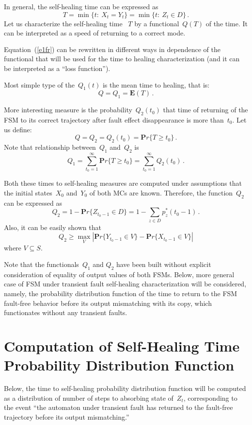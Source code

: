 \begin{multicols}{2}
In general, the self-healing time  can be expressed as
\begin{equation}
T =
\min\{t:\ X_t=Y_t\}=\min\{t:\ Z_t\in D\}\,.
\label{e1fr}
\end{equation}
Let us characterize the self-healing time ~$T$ by
a functional~$Q(T)$ of the time.
It can be interpreted as a speed of returning to
a correct mode.

Equation~(\ref{e1fr}) can be rewritten in different ways in
dependence of the functional that will be used for the time to healing characterization (and
it can be interpreted as a ``loss function'').

Most simple type of the~$Q_1(t)$ is the mean time
to healing, that is:
$$
Q = Q_1 = {\mathbf E}(T)\,.
$$

More interesting measure is the probability~$Q_2(t_0)$
that time of returning of the FSM to its correct
trajectory
after fault effect disappearance  is more than~$t_0$.
Let us define:
$$
Q = Q_2 = Q_2(t_0) = {\mathbf Pr}\{T\ge t_0\}\,.
$$
Note that relationship between~$Q_1$ and~$Q_2$ is
$$
Q_1 =
\sum_{t_0=1}^\infty {\mathbf Pr}\{T\ge t_0\}
=
\sum_{t_0=1}^\infty Q_2(t_0)\,.
$$

Both these times to self-healing measures are computed
under assumptions that the initial states~$X_0$ and~$Y_0$ of both MCs are known.
Therefore, the function~$Q_2$ can be expressed as
$$
Q_2
=
1 - {\mathbf Pr}\{Z_{t_0-1}\in D\}
=
1 - \sum_{z\in D} p_{z}^*(t_0-1)\,.
$$
Also, it can be easily shown   that
$$
Q_2
\ge
\max\limits_V
\left|{\mathbf Pr}\{Y_{t_0-1}\in V\}
-
{\mathbf Pr}\{X_{t_0-1}\in V\}\right|
$$
where $V\subseteq S$.

Note that the functionals~$Q_1$ and $Q_2$ have been built
without explicit consideration of equality of  output
values of both FSMs.
Below,  more general case of FSM under
transient fault self-healing characterization will be considered, namely,
the probability distribution function of the time to
return to the FSM fault-free behavior before its output
mismatching with its copy, which functionates without any
transient faults.

\section{Computation of   Self-Healing Time Probability
Distribution Function}

\noindent
Below, the time to self-healing probability
distribution function will be computed as a distribution of  number
of steps  to absorbing state of~$Z_t$, corresponding
to the event ``the automaton under transient fault
has returned to the fault-free trajectory before
its output mismatching.''


\end{multicols}
